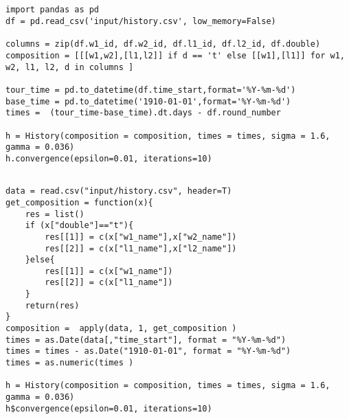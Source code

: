 \documentclass[article]{jss}
\newif\ifen
\newif\ifes
\newcommand{\en}[1]{\ifen#1\fi}
\newcommand{\es}[1]{\ifes#1\fi}
\begin{document}
\subsection{\en{The history of the Association of Tennis Professionals (ATP)}} \label{sec:appendix_atp_code}
%
\begin{lstlisting}[backgroundcolor=\color{python},caption={\en{\proglang{Python} code}\es{Código \proglang{Python}}},aboveskip=0.0 \baselineskip, belowskip=0.1cm]
import pandas as pd
df = pd.read_csv('input/history.csv', low_memory=False)

columns = zip(df.w1_id, df.w2_id, df.l1_id, df.l2_id, df.double)
composition = [[[w1,w2],[l1,l2]] if d == 't' else [[w1],[l1]] for w1, w2, l1, l2, d in columns ]

tour_time = pd.to_datetime(df.time_start,format='%Y-%m-%d')
base_time = pd.to_datetime('1910-01-01',format='%Y-%m-%d')
times =  (tour_time-base_time).dt.days - df.round_number

h = History(composition = composition, times = times, sigma = 1.6, gamma = 0.036)
h.convergence(epsilon=0.01, iterations=10)
\end{lstlisting}
%
\begin{lstlisting}[backgroundcolor=\color{r},caption={\en{\proglang{R} code}\es{Código \proglang{R}}},aboveskip=0.0 \baselineskip, belowskip=0.1cm]

data = read.csv("input/history.csv", header=T)
get_composition = function(x){
    res = list()
    if (x["double"]=="t"){
        res[[1]] = c(x["w1_name"],x["w2_name"])
        res[[2]] = c(x["l1_name"],x["l2_name"])
    }else{
        res[[1]] = c(x["w1_name"])
        res[[2]] = c(x["l1_name"])
    }
    return(res)
}
composition =  apply(data, 1, get_composition ) 
times = as.Date(data[,"time_start"], format = "%Y-%m-%d")
times = times - as.Date("1910-01-01", format = "%Y-%m-%d")
times = as.numeric(times )

h = History(composition = composition, times = times, sigma = 1.6, gamma = 0.036)
h$convergence(epsilon=0.01, iterations=10)
\end{lstlisting}


\subsection{\en{Gaussian product}}\label{multiplicacion_normales}
\end{document}
